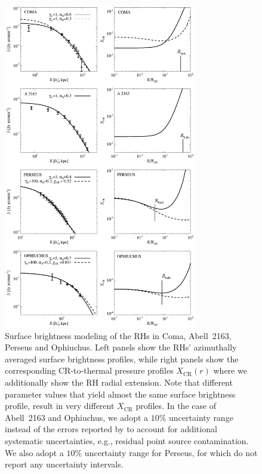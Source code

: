 \documentclass[traditabstract]{aa}
\newcommand{\rmn}{\mathrm}
\begin{document}
\begin{figure}[t!]
\centering
\includegraphics[width=0.75\textwidth]{figures/SB_profiles_ALL.eps}
\caption{Surface brightness modeling of the RHs in Coma, Abell~2163, Perseus and
  Ophiuchus. Left panels show the RHs' azimuthally averaged surface brightness
  profiles, while right panels show the corresponding CR-to-thermal pressure
  profiles $X_{\rmn{CR}}(r)$ where we additionally show the RH radial extension. 
  Note that different parameter values that yield
  almost the same surface brightness profile, result in very different
  $X_{\rmn{CR}}$ profiles. In the case of Abell~2163 and Ophiuchus, we adopt a
  $10\%$ uncertainty range instead of the errors reported by
  \cite{2009A&A...499..679M} to account for additional systematic uncertainties,
  e.g., residual point source contamination. We also adopt a $10\%$ uncertainty
  range for Perseus, for which \cite{1990MNRAS.246..477P} do not report any
  uncertainty intervals.}
\label{fig:SBmodeling}
\end{figure}
\end{document}

